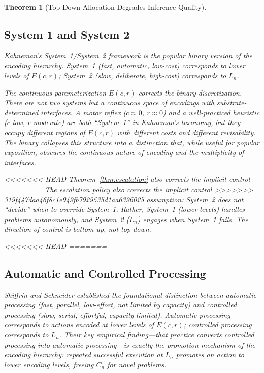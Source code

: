 \documentclass[11pt]{article}
\newtheorem{theorem}{Theorem}
\theoremstyle{definition}
\begin{document}
\begin{theorem}[Top-Down Allocation Degrades Inference Quality]
\subsection{System 1 and System 2}

Kahneman's System~1/System~2 framework \cite{Kahneman2011} is the
popular binary version of the encoding hierarchy. System~1 (fast,
automatic, low-cost) corresponds to lower levels of $E(c,r)$;
System~2 (slow, deliberate, high-cost) corresponds to $L_n$.

The continuous parameterization $E(c,r)$ corrects the binary
discretization. There are not two systems but a continuous space of
encodings with substrate-determined interfaces. A motor reflex
($c \approx 0$, $r \approx 0$) and a well-practiced heuristic
($c$ low, $r$ moderate) are both ``System~1'' in Kahneman's
taxonomy, but they occupy different regions of $E(c,r)$ with different
costs and different revisability. The binary collapses this structure
into a distinction that, while useful for popular exposition, obscures
the continuous nature of encoding and the multiplicity of interfaces.

<<<<<<< HEAD
Theorem~\ref{thm:escalation} also corrects the implicit control
=======
The escalation policy also corrects the implicit control
>>>>>>> 319f447daa46f8c1e949fb7929535d1aa6396025
assumption: System~2 does not ``decide'' when to override System~1.
Rather, System~1 (lower levels) handles problems autonomously, and
System~2 ($L_n$) engages when System~1 fails. The direction of
control is bottom-up, not top-down.

<<<<<<< HEAD
=======
\subsection{Automatic and Controlled Processing}

Shiffrin and Schneider \cite{ShiffrinSchneider1977} established the
foundational distinction between automatic processing (fast, parallel,
low-effort, not limited by capacity) and controlled processing (slow,
serial, effortful, capacity-limited). Automatic processing corresponds
to actions encoded at lower levels of $E(c,r)$; controlled processing
corresponds to $L_n$. Their key empirical finding---that practice
converts controlled processing into automatic processing---is exactly
the promotion mechanism of the encoding hierarchy: repeated successful
execution at $L_n$ promotes an action to lower encoding levels, freeing
$C_n$ for novel problems.


\end{theorem}
\end{document}
